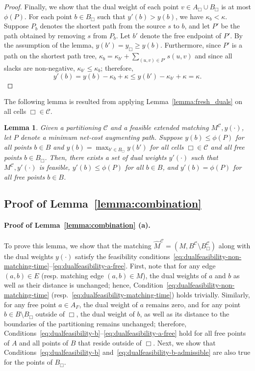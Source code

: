 \documentclass[11pt,onecolumn]{article}
\def\mcC{{\mathcal{C}}}
\newcommand{\cell}{\Box}
\newtheorem{lemma}{Lemma}[section]
\newcommand\myparagraph[1]{\paragraph{#1}}
\begin{document}
\begin{proof}
    Finally, we show that the dual weight of each point $v\in A_\cell\cup B_\cell$ is at most $\phi(P)$.
    For each point $b\in B_\cell$ such that $y'(b)> y(b)$, we have $\kappa_b<\kappa$. Suppose $P_b$ denotes the shortest path from the source $s$ to $b$, and let $P'$ be the path obtained by removing $s$ from $P_b$. Let $b'$ denote the free endpoint of $P'$. By the assumption of the lemma, $y(b')=y_\cell\ge y(b)$. Furthermore, since $P'$ is a path on the shortest path tree, $\kappa_b = \kappa_{b'} + \sum_{(u,v)\in P'} s(u,v)$ and since all slacks are non-negative, $\kappa_{b'}\le \kappa_b$; therefore, 
    \[y'(b)=y(b)-\kappa_b+\kappa\le y(b')-\kappa_{b'}+\kappa=\kappa.\]
    
\end{proof}

The following lemma is resulted from applying Lemma~\ref{lemma:fresh_duals} on all cells $\cell\in \mcC$. 

\begin{lemma}\label{lemma:adjust_duals}
    Given a partitioning $\mcC$ and a feasible extended matching $M^\mcC, y(\cdot)$, let $P$ denote a minimum net-cost augmenting path. Suppose $y(b)\le \phi(P)$ for all points $b\in B$ and $y(b)=\max_{b'\in B_\cell}y(b')$ for all cells $\cell\in \mcC$ and all free points $b\in B_\cell$. Then, there exists a set of dual weights $y'(\cdot)$ such that $M^\mcC, y'(\cdot)$ is feasible, $y'(b)\le \phi(P)$ for all $b\in B$, and $y'(b)=\phi(P)$ for all free points $b\in B$.
\end{lemma}



\subsection{Proof of Lemma~\ref{lemma:combination}}



\combination*
\myparagraph{Proof of Lemma~\ref{lemma:combination} (a).}
To prove this lemma, we show that the matching $\hat{M}^\mcC=(M, B^\mcC\setminus B_\cell^\mcC)$ along with the dual weights $y(\cdot)$ satisfy the feasibility conditions~\eqref{eq:dualfeasibility-non-matching-time}--\eqref{eq:dualfeasibility-a-free}. 
First, note that for any edge $(a,b)\in E$ (resp. matching edge $(a,b)\in M$), the dual weights of $a$ and $b$ as well as their distance is unchanged; hence, Condition~\eqref{eq:dualfeasibility-non-matching-time} (resp.~\eqref{eq:dualfeasibility-matching-time}) holds trivially. Similarly, for any free point $a\in A_F$, the dual weight of $a$ remains zero, and for any point $b\in B\setminus B_\cell$ outside of $\cell$, the dual weight of $b$, as well as its distance to the boundaries of the partitioning remains unchanged; therefore, Conditions~\eqref{eq:dualfeasibility-b}--\eqref{eq:dualfeasibility-a-free} hold for all free points of $A$ and all points of $B$ that reside outside of $\cell$. Next, we show that Conditions~\eqref{eq:dualfeasibility-b} and~\eqref{eq:dualfeasibility-b-admissible} are also true for the points of $B_\cell$.
\end{document}
